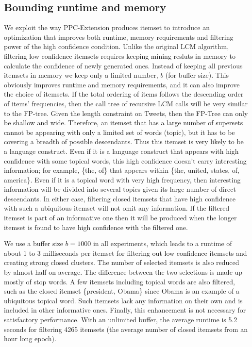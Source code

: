 \documentclass{sig-alternate}
\begin{document}
\subsection{Bounding runtime and memory}
\label{sec:bounding}
We exploit the way PPC-Extension produces itemset to introduce an optimization that improves both runtime, memory requirements and filtering power of the high confidence condition. Unlike the original LCM algorithm, filtering low confidence itemsets requires keeping mining resluts in memory to calculate the confidence of newly generated ones.
Instead of keeping all previous itemsets in memory we keep only a limited number, $b$ (for buffer size). This obviously improves runtime and memory requirements, and it can also improve the choice of itemsets. If the total ordering of items follows the descending order of items' frequencies, then the call tree of recursive LCM calls will be very similar to the FP-tree. Given the length constraint on Tweets, then the FP-Tree can only be shallow and wide. 
Therefore, an itemset that has a large number of supersets cannot be appearing with only a limited set of words (topic), but it has to be covering a breadth of possible descendants. Thus this itemset is very likely to be a language construct. Even if it is a language construct that appears with high confidence with some topical words, this high confidence doesn't carry interesting information; for example, \{the, of\} that appears within \{the, united, states, of, america\}. Even if it is a topical word with very high frequency, then interesting information will be divided into several topics given its large number of direct descendants. In either case, filtering closed itemsets that have high confidence with such a ubiquitous itemset will not omit any information. If the filtered itemset is part of an informative one then it will be produced when the longer itemset is found to have high confidence with the filtered one.

We use a buffer size $b=1000$ in all experiments, which leads to a runtime of about 1 to 3 milliseconds per itemset for filtering out low confidence itemsets and creating strong closed clusters. The number of selected itemsets is also reduced by almost half on average. The difference between the two selections is made up mostly of stop words. A few itemsets including topical words are also filtered, such as the closed itemset \{president, Obama\} since Obama is an example of a ubiquitous topical word. Such itemsets lack any information on their own and is included in other informative ones. Finally, this enhancement is not necessary for satisfactory performance. With an unlimited buffer, the average runtime is 5.2 seconds for filtering 4265 itemsets (the average number of closed itemsets from an hour long epoch).
\end{document}
